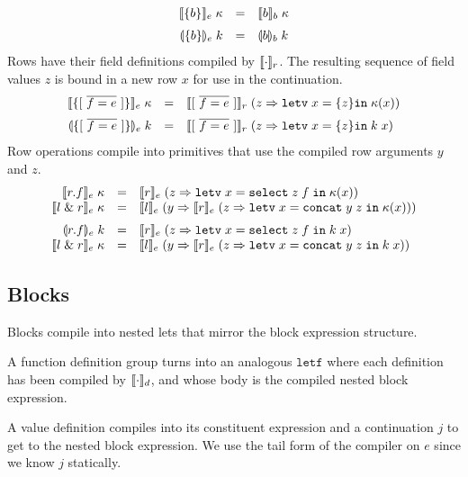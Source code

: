 \documentclass[11pt]{article}
\newcommand{\kw}[1]{\mathtt{#1}}
\begin{document}
\[
\begin{array}{rcll}
\cmpk{e}{\blke{b}} & = &
  \cmpin{b}{b}{\kappa} \medskip \\

\tcmpk{e}{\blke{b}} & = &
  \tcmpin{b}{b}{k} \\
\end{array}
\]
Rows have their field definitions compiled by $\llbracket \cdot \rrbracket_r$.
The resulting sequence of field values $z$ is bound in a new row $x$ for use in the continuation.
\[
\begin{array}{rcll}
\cmpk{e}{\rowe{f}{e}} & = &
  \cmpin{r}{\flds{f}{e}}{(z => \letv{x}{\rowvs{z}}{\kappa(x)})} \medskip \\

\tcmpk{e}{\rowe{f}{e}} & = &
  \cmpin{r}{\flds{f}{e}}{(z => \letv{x}{\rowvs{z}}{\appc{k}{x}})} \\
\end{array}
\]
Row operations compile into primitives that use the compiled row arguments $y$ and $z$.
\[
\begin{array}{rcll}
\cmpk{e}{\sele{r}{f}} & = &
  \cmpin{e}{r}{(z => \letv{x}{\selv{z}{f}}{\kappa(x)})} \\
\cmpk{e}{\ande{l}{r}} & = &
  \cmpin{e}{l}{(y => \cmpin{e}{r}{(z => \letv{x}{\andv{y}{z}}{\kappa(x)})})} \medskip \\

\tcmpk{e}{\sele{r}{f}} & = &
  \cmpin{e}{r}{(z => \letv{x}{\selv{z}{f}}{\appc{k}{x}})} \\
\cmpk{e}{\ande{l}{r}} & = &
  \cmpin{e}{l}{(y => \cmpin{e}{r}{(z => \letv{x}{\andv{y}{z}}{\appc{k}{x}})})} \\
\end{array}
\]

\subsection*{Blocks}

Blocks compile into nested lets that mirror the block expression structure.

A function definition group turns into an analogous $\kw{letf}$ where each definition has been compiled by $\llbracket \cdot \rrbracket_d$, and whose body is the compiled nested block expression.

A value definition compiles into its constituent expression and a continuation $j$ to get to the nested block expression.
We use the tail form of the compiler on $e$ since we know $j$ statically.
\end{document}

